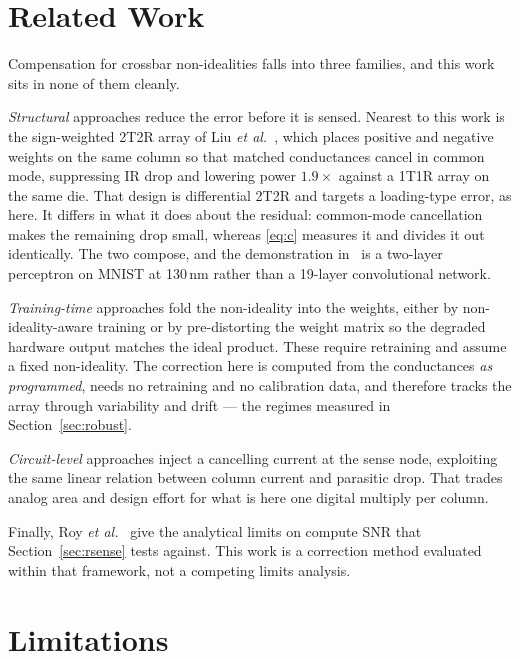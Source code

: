 \documentclass[conference,10pt]{IEEEtran}
\begin{document}
\section{Related Work}
\label{sec:related}

Compensation for crossbar non-idealities falls into three families, and this
work sits in none of them cleanly.

\emph{Structural} approaches reduce the error before it is sensed. Nearest to
this work is the sign-weighted 2T2R array of Liu \emph{et al.}~\cite{swtt},
which places positive and negative weights on the same column so that matched
conductances cancel in common mode, suppressing IR drop and lowering power
$1.9\times$ against a 1T1R array on the same die. That design is differential
2T2R and targets a loading-type error, as here. It differs in what it does
about the residual: common-mode cancellation makes the remaining drop small,
whereas \eqref{eq:c} measures it and divides it out identically. The two
compose, and the demonstration in~\cite{swtt} is a two-layer perceptron on
MNIST at 130\,nm rather than a 19-layer convolutional network.

\emph{Training-time} approaches fold the non-ideality into the weights, either
by non-ideality-aware training or by pre-distorting the weight matrix so the
degraded hardware output matches the ideal product. These require retraining
and assume a fixed non-ideality. The correction here is computed from the
conductances \emph{as programmed}, needs no retraining and no calibration
data, and therefore tracks the array through variability and drift --- the
regimes measured in Section~\ref{sec:robust}.

\emph{Circuit-level} approaches inject a cancelling current at the sense node,
exploiting the same linear relation between column current and parasitic drop.
That trades analog area and design effort for what is here one digital
multiply per column.

Finally, Roy \emph{et al.}~\cite{shanbhag} give the analytical limits on
compute SNR that Section~\ref{sec:rsense} tests against. This work is a
correction method evaluated within that framework, not a competing limits
analysis.

\section{Limitations}
\label{sec:limits}
\end{document}
